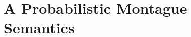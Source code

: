 \documentclass[a4paper,11pt]{article}
\renewcommand{\cite}{\citep}
\theoremstyle{definition}
\begin{document}






\section{A Probabilistic Montague Semantics}
\end{document}

